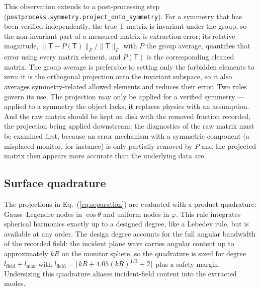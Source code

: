 \documentclass[11pt]{article}
\begin{document}
This observation extends to a post-processing step
(\texttt{postprocess.symmetry.project\_onto\_symmetry}).  For a
symmetry that has been verified independently, the true T-matrix is
invariant under the group, so the non-invariant part of a measured
matrix is extraction error; its relative magnitude,
$\|\mathsf{T} - P(\mathsf{T})\|_F/\|\mathsf{T}\|_F$ with $P$ the group
average, quantifies that error using every matrix element, and
$P(\mathsf{T})$ is the corresponding cleaned matrix.  The group
average is preferable to setting only the forbidden elements to zero:
it is the orthogonal projection onto the invariant subspace, so it
also averages symmetry-related allowed elements and reduces their
error.  Two rules govern its use.  The projection may only be applied
for a verified symmetry --- applied to a symmetry the object lacks, it
replaces physics with an assumption.  And the raw matrix should be
kept on disk with the removed fraction recorded, the projection being
applied downstream: the diagnostics of the raw matrix must be examined
first, because an error mechanism with a symmetric component (a
misplaced monitor, for instance) is only partially removed by $P$ and
the projected matrix then appears more accurate than the underlying
data are.

\subsection{Surface quadrature}
The projections in Eq.~(\ref{eq:separation}) are evaluated with a product
quadrature: Gauss--Legendre nodes in $\cos\theta$ and uniform nodes in
$\varphi$.  This rule integrates spherical harmonics exactly up to a
designed degree, like a Lebedev rule, but is available at any order.  The
design degree accounts for the full angular bandwidth of the recorded
field: the incident plane wave carries angular content up to
approximately $kR$ on the monitor sphere, so the quadrature is sized for
degree $l_{\mathrm{field}} + l_{\max}$ with
$l_{\mathrm{field}} = \lceil kR + 4.05(kR)^{1/3} + 2\rceil$ plus a safety
margin.  Undersizing this quadrature aliases incident-field content into
the extracted modes.
\end{document}

